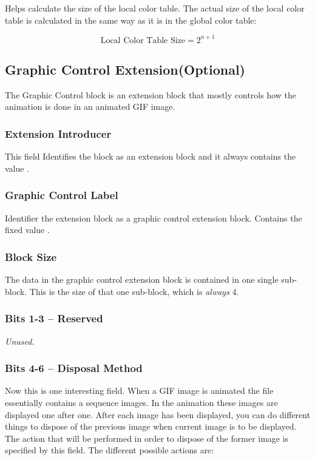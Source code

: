   Helps calculate the size of the local color table. The actual size
  of the local color table is calculated in the same way as it is in
  the global color table:

  \begin{equation*}
    \textrm{Local Color Table Size} = 2^{n + 1}
  \end{equation*}

  \subsection{Graphic Control Extension(Optional)}

  The Graphic Control block is an extension block that mostly controls
  how the animation is done in an animated GIF image.

  \subsubsection{Extension Introducer}

  This field Identifies the block as an extension block and it always
  contains the value .

  \subsubsection{Graphic Control Label}

  Identifier the extension block as a graphic control extension
  block. Contains the fixed value .

  \subsubsection{Block Size}

  The data in the graphic control extension block is contained in one
  single sub-block. This is the size of that one sub-block, which is
  \textit{always} $4$.

  \subsubsection{Bits 1-3 -- Reserved}

  \textit{Unused}.

  \subsubsection{Bits 4-6 -- Disposal Method}

  Now this is one interesting field. When a GIF image is animated the
  file essentially contains a sequence images. In the animation these
  images are displayed one after one. After each image has been
  displayed, you can do different things to dispose of the previous
  image when current image is to be displayed. The action that will be
  performed in order to dispose of the former image is specified by
  this field. The different possible actions are:

